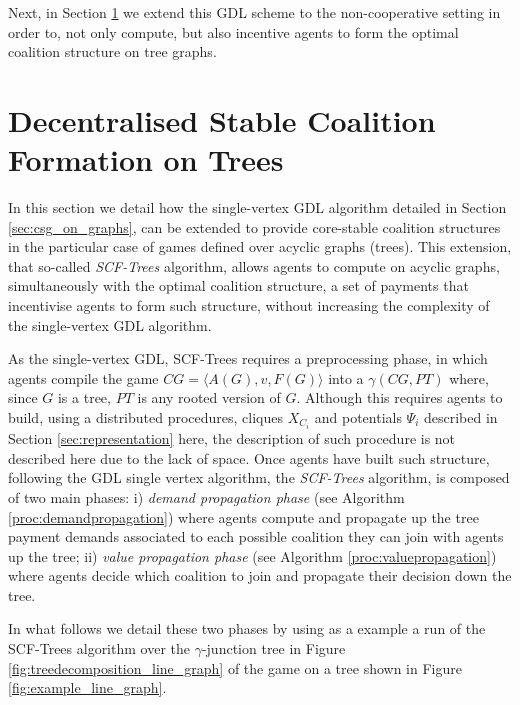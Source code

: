 \documentclass{aamas2012}
\begin{document}
Next, in Section \ref{sec:algorithm_stable_on_trees} we extend this GDL
scheme to the non-cooperative setting in order to, not only compute, 
but also incentive agents to form the optimal coalition structure on tree
graphs.


\vspace{-0.1in}\section{Decentralised Stable Coalition Formation on Trees}
\label{sec:algorithm_stable_on_trees}


\noindent In this section we detail how the single-vertex GDL algorithm
detailed in Section \ref{sec:csg_on_graphs}, can be extended to provide
core-stable coalition structures in the particular case of games defined over acyclic graphs (trees). 
This extension, that so-called \emph{SCF-Trees} algorithm, allows agents to
compute on acyclic graphs, simultaneously with the optimal coalition structure, a set of
payments that incentivise agents to form such structure, without increasing the complexity of
the single-vertex GDL algorithm.

As the single-vertex GDL, SCF-Trees requires a
preprocessing phase, in which agents compile the game $CG=\langle
A(G),v,F(G)\rangle$ into a $\gamma(CG,PT)$ where, since $G$ is
a tree, $PT$ is any rooted version of $G$. Although this requires agents
to build, using a distributed procedures, cliques $X_{C_i}$ and potentials $\Psi_i$
described in Section \ref{sec:representation} here, the description of such
procedure is not described here due to the lack of space.
Once agents have built such structure, following the GDL single vertex
algorithm, the \emph{SCF-Trees}
algorithm, is
composed of two main phases: i) \emph{demand propagation phase} (see Algorithm
\ref{proc:demandpropagation}) where agents compute and propagate up the tree
payment demands associated to each possible coalition they can join with agents
up the tree; ii) \emph{value propagation phase} (see Algorithm
\ref{proc:valuepropagation}) where agents decide which coalition to join and propagate their decision down the
tree.

In what follows we detail these two phases by using
as a example a run of the SCF-Trees algorithm over the $\gamma$-junction
tree in Figure \ref{fig:treedecomposition_line_graph} of the game on
a tree shown in Figure \ref{fig:example_line_graph}.
\end{document}
